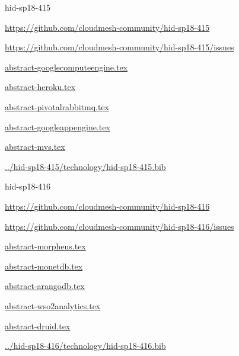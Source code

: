 \begin{IU}

hid-sp18-415

\url{https://github.com/cloudmesh-community/hid-sp18-415}

\url{https://github.com/cloudmesh-community/hid-sp18-415/issues}

\href{https://github.com/cloudmesh-community/hid-sp18-415/blob/master//technology/abstract-googlecomputeengine.tex}{abstract-googlecomputeengine.tex}

\href{https://github.com/cloudmesh-community/hid-sp18-415/blob/master//technology/abstract-heroku.tex}{abstract-heroku.tex}

\href{https://github.com/cloudmesh-community/hid-sp18-415/blob/master//technology/abstract-pivotalrabbitmq.tex}{abstract-pivotalrabbitmq.tex}

\href{https://github.com/cloudmesh-community/hid-sp18-415/blob/master//technology/abstract-googleappengine.tex}{abstract-googleappengine.tex}

\href{https://github.com/cloudmesh-community/hid-sp18-415/blob/master//technology/abstract-mvs.tex}{abstract-mvs.tex}

\href{https://github.com/cloudmesh-community/hid-sp18-415/blob/master//technology/hid-sp18-415.bib}{../hid-sp18-415/technology/hid-sp18-415.bib}

\end{IU}


\begin{IU}

hid-sp18-416

\url{https://github.com/cloudmesh-community/hid-sp18-416}

\url{https://github.com/cloudmesh-community/hid-sp18-416/issues}

\href{https://github.com/cloudmesh-community/hid-sp18-416/blob/master//technology/abstract-morpheus.tex}{abstract-morpheus.tex}

\href{https://github.com/cloudmesh-community/hid-sp18-416/blob/master//technology/abstract-monetdb.tex}{abstract-monetdb.tex}

\href{https://github.com/cloudmesh-community/hid-sp18-416/blob/master//technology/abstract-arangodb.tex}{abstract-arangodb.tex}

\href{https://github.com/cloudmesh-community/hid-sp18-416/blob/master//technology/abstract-wso2analytics.tex}{abstract-wso2analytics.tex}

\href{https://github.com/cloudmesh-community/hid-sp18-416/blob/master//technology/abstract-druid.tex}{abstract-druid.tex}

\href{https://github.com/cloudmesh-community/hid-sp18-416/blob/master//technology/hid-sp18-416.bib}{../hid-sp18-416/technology/hid-sp18-416.bib}

\end{IU}


